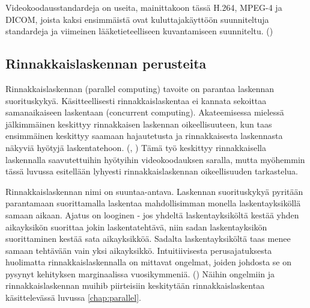 Videokoodausstandardeja on useita, mainittakoon tässä H.264, MPEG-4 ja DICOM,
joista kaksi ensimmäistä ovat kuluttajakäyttöön suunniteltuja standardeja
ja viimeinen lääketieteelliseen kuvantamiseen suunniteltu. (\citealt{h264})

\subsection{Rinnakkaislaskennan perusteita}

Rinnakkaislaskennan (parallel computing) tavoite on parantaa laskennan
suorituskykyä. Käsitteellisesti rinnakkaislaskentaa ei kannata sekoittaa
samanaikaiseen laskentaan (concurrent computing). Akateemisessa mielessä
jälkimmäinen keskittyy rinnakkaisen laskennan oikeellisuuteen, kun taas
ensimmäinen keskittyy saamaan hajautetusta ja rinnakkaisesta laskennasta
näkyviä hyötyjä laskentatehoon. (\citealt{intro}, \citealt{ari}) Tämä työ keskittyy
rinnakkaisella laskennalla saavutettuihin hyötyihin videokoodauksen saralla,
mutta myöhemmin tässä luvussa esitellään lyhyesti rinnakkaislaskennan
oikeellisuuden tarkastelua.

Rinnakkaislaskennan nimi on suuntaa-antava. Laskennan suorituskykyä pyritään parantamaan
suorittamalla laskentaa mahdollisimman monella laskentayksiköllä samaan aikaan.
Ajatus on looginen - jos yhdeltä laskentayksiköltä kestää yhden aikayksikön
suorittaa jokin laskentatehtävä, niin sadan laskentayksikön suorittaminen
kestää sata aikayksikköä. Sadalta laskentayksiköltä taas menee samaan tehtävään
vain yksi aikayksikkö. Intuitiivisesta perusajatuksesta huolimatta
rinnakkaislaskennalla on mittavat ongelmat, joiden
johdosta se on pysynyt kehityksen marginaalissa vuosikymmeniä.
(\citealt{intro}) Näihin ongelmiin ja rinnakkaislaskennan muihib piirteisiin
keskitytään rinnakkaislaskentaa käsittelevässä luvussa \ref{chap:parallel}.

